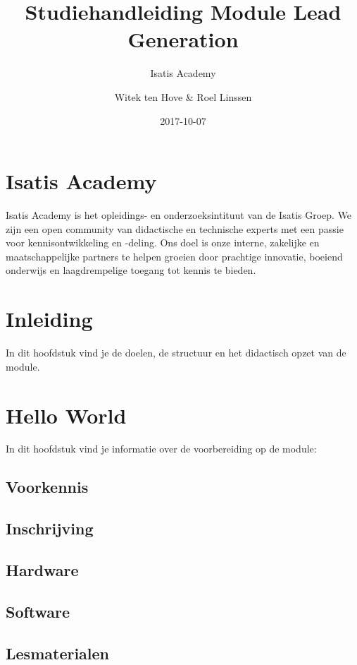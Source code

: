 \documentclass[]{book}
\title{Studiehandleiding Module Lead Generation}
\subtitle{Isatis Academy}
\author{Witek ten Hove \& Roel Linssen}
\date{2017-10-07}
\begin{document}
\maketitle

{
\setcounter{tocdepth}{1}
\tableofcontents
}
\chapter{Isatis Academy}\label{isatis-academy}

Isatis Academy is het opleidings- en onderzoeksintituut van de Isatis
Groep. We zijn een open community van didactische en technische experts
met een passie voor kennisontwikkeling en -deling. Ons doel is onze
interne, zakelijke en maatschappelijke partners te helpen groeien door
prachtige innovatie, boeiend onderwijs en laagdrempelige toegang tot
kennis te bieden.

\chapter{Inleiding}\label{inleiding}

In dit hoofdstuk vind je de doelen, de structuur en het didactisch opzet
van de module.

\chapter{Hello World}\label{hello-world}

In dit hoofdstuk vind je informatie over de voorbereiding op de module:

\section{Voorkennis}\label{voorkennis}

\section{Inschrijving}\label{inschrijving}

\section{Hardware}\label{hardware}

\section{Software}\label{software}

\section{Lesmaterialen}\label{lesmaterialen}
\end{document}
